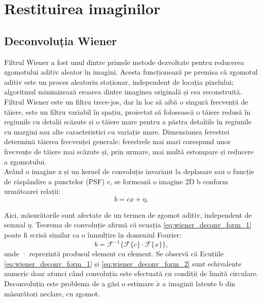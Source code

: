 \documentclass[12pt]{article}
\begin{document}
\newpage
\section{Restituirea imaginilor}
\label{sec:restituirea_imaginilor}

\subsection{Deconvoluția Wiener}
\label{sec:deconv_wiener}

Filtrul Wiener a fost unul dintre primele metode dezvoltate pentru reducerea zgomotului aditiv aleator în imagini. Acesta funcționează pe premisa că zgomotul aditiv este un proces aleatoriu staționar, independent de locația pixelului; algoritmul minimizează eroarea dintre imaginea originală și cea reconstruită. Filtrul Wiener este un filtru trece-jos, dar în loc să aibă o singură frecvență de tăiere, este un filtru variabil în spațiu, proiectat să folosească o tăiere redusă în regiunile cu detalii scăzute și o tăiere mare pentru a păstra detaliile în regiunile cu margini sau alte caracteristici cu variație mare. Dimensiunea ferestrei determină tăierea frecvenței generale: ferestrele mai mari corespund unor frecvențe de tăiere mai scăzute și, prin urmare, mai multă estompare și reducere a zgomotului.\\

Având o imagine x și un kernel de convoluție invariant la deplasare sau o funcție de răspândire a punctelor (PSF) c, se formează o imagine 2D b conform următoarei relații:
\begin{equation}
b = cx + \eta,
\label{eq:wiener_deconv_form_1}
\end{equation}

Aici, măsurătorile sunt afectate de un termen de zgomot aditiv, independent de semnal ${\eta}$.
Teorema de convoluție afirmă că ecuația \ref{eq:wiener_deconv_form_1} poate fi scrisă similar ca o înmulțire în domeniul Fourier:
\begin{equation}
b = \mathcal{F}^{-1}\{\mathcal{F}\{c\} \cdot \mathcal{F}\{x\}\},
\label{eq:wiener_deconv_form_2}
\end{equation}
unde · reprezintă produsul element cu element. Se observă că Ecuțiile \ref{eq:wiener_deconv_form_1} și \ref{eq:wiener_deconv_form_2} sunt echivalente numeric doar atunci când convoluția este efectuată cu condiții de limită circulare.\\
\indent Deconvoluția este problema de a găsi o estimare ${\tilde{x}}$ a imaginii latente b din măsurători neclare, cu zgomot.
\end{document}
